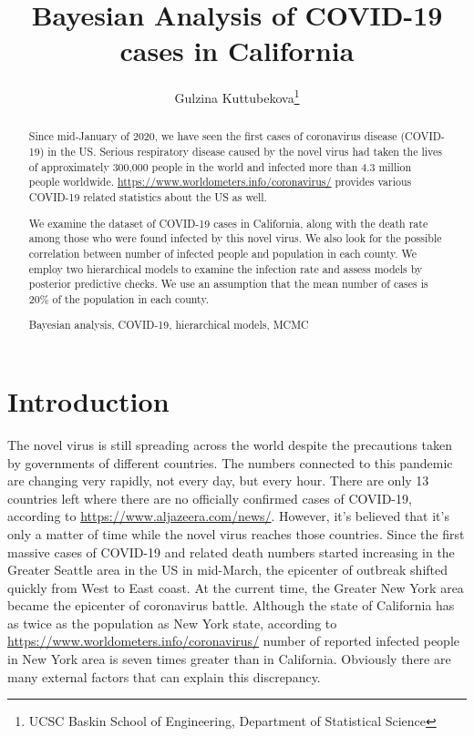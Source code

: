 \documentclass[11pt,twocolumn]{asaproc}
\title{Bayesian Analysis of COVID-19 cases in California}
\author{Gulzina Kuttubekova\thanks{UCSC Baskin School of Engineering, Department of Statistical Science}}
\begin{document}
\maketitle




\begin{abstract}
 Since mid-January of 2020, we have seen the first cases of coronavirus disease (COVID-19) in the US. Serious respiratory disease caused by the novel virus had taken the lives of approximately 300,000 people in the world and infected more than 4.3 million people worldwide. \url{https://www.worldometers.info/coronavirus/} provides various COVID-19 related statistics about the US as well.

We examine the dataset of COVID-19 cases in California, along with the death rate among those who were found infected by this novel virus. We also look for the possible correlation between number of infected people and population in each county. We employ two hierarchical models to examine the infection rate and assess models by posterior predictive checks. We use an assumption that the mean number of cases is 20\% of the population in each county. 



\begin{keywords}
Bayesian analysis, COVID-19, hierarchical models, MCMC
\end{keywords}
\end{abstract}







\section{Introduction\label{Introduction}}

 The novel virus is still spreading across the world despite the precautions taken by governments of different countries. The numbers connected to this pandemic are changing very rapidly, not every day, but every hour.  There are only 13 countries left where there are no officially confirmed cases of COVID-19, according to \url{https://www.aljazeera.com/news/}. However, it's believed that it's only a matter of time while the novel virus reaches those countries. Since the first massive cases of COVID-19 and related death numbers started increasing in the Greater Seattle area in the US in mid-March, the epicenter of outbreak shifted quickly from West to East coast. At the current time, the Greater New York area became the epicenter of coronavirus battle. Although the state of California has as twice as the population as New York state, according to \url{https://www.worldometers.info/coronavirus/} number of reported infected people in New York area is seven times greater than in California. Obviously there are many external factors that can explain this discrepancy.
 
\end{document}
